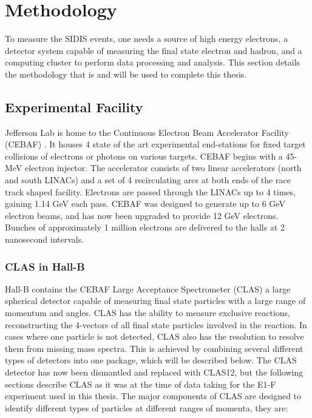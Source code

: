 \section{Methodology}
To measure the SIDIS events, one needs a source of high energy electrons, a detector system capable of measuring the final state electron and hadron, and a computing cluster to perform data processing and analysis.  This section details the methodology that is and will be used to complete this thesis.

\subsection{Experimental Facility}
Jefferson Lab is home to the Continuous Electron Beam Accelerator Facility (CEBAF) \cite{hardware-leemann:2001}.  It houses 4 state of the art experimental end-stations for fixed target collisions of electrons or photons on various targets.  CEBAF begins with a 45-MeV electron injector.  The accelerator consists of two linear accelerators (north and south LINACs) and a set of 4 recirculating arcs at both ends of the race track shaped facility.  Electrons are passed through the LINACs up to 4 times, gaining 1.14 GeV each pass.  CEBAF was designed to generate up to 6 GeV electron beams, and has now been upgraded to provide 12 GeV electrons. Bunches of approximately 1 million electrons are delivered to the halls at 2 nanosecond intervals.

\subsubsection{CLAS in Hall-B}
Hall-B contains the CEBAF Large Acceptance Spectrometer (CLAS) a large spherical detector capable of measuring final state particles with a large range of momentum and angles.  CLAS has the ability to measure exclusive reactions, reconstructing the 4-vectors of all final state particles involved in the reaction.  In cases where one particle is not detected, CLAS also has the resolution to resolve them from missing mass spectra.  This is achieved by combining several different types of detectors into one package, which will be described below.  The CLAS detector has now been dismantled and replaced with CLAS12, but the following sections describe CLAS as it was at the time of data taking for the E1-F experiment used in this thesis.  The major components of CLAS \cite{hardware-mecking:2003} are designed to identify different types of particles at different ranges of momenta, they are:

